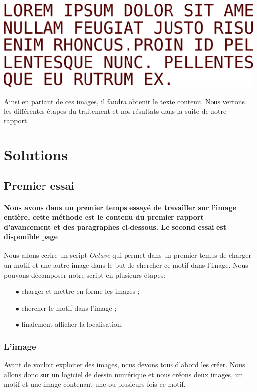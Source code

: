 \documentclass[a4paper,12pt,titlepage]{report}
\newcommand{\octave}{\textit{Octave }}
\begin{document}
\begin{center}
			\includegraphics[scale=0.1]{../../Data/lorem.png}
		\end{center}
		
Ainsi en partant de ces images, il faudra obtenir le texte contenu. Nous verrons les différentes étapes du traitement et nos résultats dans la suite de notre rapport.
		\section{Solutions}
		\subsection{Premier essai}
		\paragraph*{Nous avons dans un premier temps essayé de travailler sur l'image entière, cette méthode est le contenu du premier rapport d'avancement et des paragraphes ci-dessous. Le second essai est disponible \hyperref[essai2]{page~\pageref*{essai2}}}
				
		Nous allons écrire un script \octave qui permet dans un premier temps de charger un motif et une autre image dans le but de chercher ce motif dans l'image. Nous pouvons décomposer notre script en plusieurs étapes:
		\begin{itemize}
			\item[$\bullet$] charger et mettre en forme les images ;
			\item[$\bullet$] chercher le motif dans l'image ;
			\item[$\bullet$] finalement afficher la localisation.
		\end{itemize}	   
		\subsubsection{L'image}
		\label{image}
		Avant de vouloir exploiter des images, nous devons tous d'abord les créer. Nous allons donc sur un logiciel de dessin numérique et nous créons deux images, un motif et une image contenant une ou plusieurs fois ce motif.
			
\end{document}

